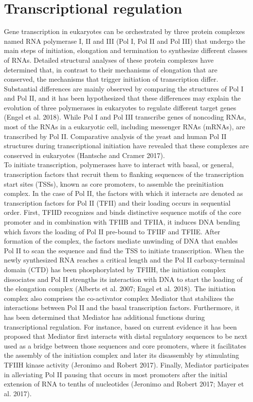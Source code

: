 	\section{Transcriptional regulation}
Gene transcription in eukaryotes can be orchestrated by three protein complexes named RNA polymerase I, II and III (Pol I, Pol II and Pol III) that undergo the main steps of initiation, elongation and termination to synthesize different classes of RNAs. Detailed structural analyses of these protein complexes have determined that, in contrast to their mechanisms of elongation that are conserved, the mechanisms that trigger initiation of transcription differ. Substantial differences are mainly observed by comparing the structures of Pol I and Pol II, and it has been hypothesized that these differences may explain the evolution of three polymerases in eukaryotes to regulate different target genes (Engel et al. 2018). While Pol I and Pol III transcribe genes of noncoding RNAs, most of the RNAs in a eukaryotic cell, including messenger RNAs (mRNAs), are transcribed by Pol II. Comparative analysis of the yeast and human Pol II structures during transcriptional initiation have revealed that these complexes are conserved in eukaryotes (Hantsche and Cramer 2017).\\

To initiate transcription, polymerases have to interact with basal, or general, transcription factors that recruit them to flanking sequences of the transcription start sites (TSSs), known as core promoters, to assemble the preinitiation complex. In the case of Pol II, the factors with which it interacts are denoted as transcription factors for Pol II (TFII) and their loading occurs in sequential order. First, TFIID recognizes and binds distinctive sequence motifs of the core promoter and in combination with TFIIB and TFIIA, it induces DNA bending which favors the loading of Pol II pre-bound to TFIIF and TFIIE. After formation of the complex, the factors mediate unwinding of DNA that enables Pol II to scan the sequence and find the TSS to initiate transcription. When the newly synthesized RNA reaches a critical length and the Pol II carboxy-terminal domain (CTD) has been phosphorylated by TFIIH, the initiation complex dissociates and Pol II strengths its interaction with DNA to start the loading of the elongation complex (Alberts et al. 2007; Engel et al. 2018). The initiation complex also comprises the co-activator complex Mediator that stabilizes the interactions between Pol II and the basal transcription factors. Furthermore, it has been determined that Mediator has additional functions during transcriptional regulation. For instance, based on current evidence it has been proposed that Mediator first interacts with distal regulatory sequences to be next used as a bridge between those sequences and core promoters, where it facilitates the assembly of the initiation complex and later its disassembly by stimulating TFIIH kinase activity (Jeronimo and Robert 2017). Finally, Mediator participates in alleviating Pol II pausing that occurs in most promoters after the initial extension of RNA to tenths of nucleotides (Jeronimo and Robert 2017; Mayer et al. 2017).\\

